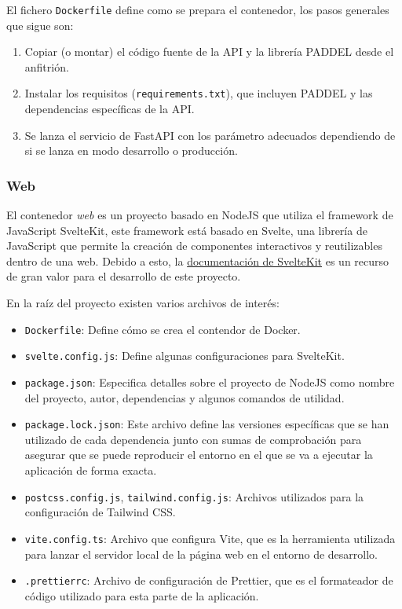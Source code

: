 El fichero \texttt{Dockerfile} define como se prepara el contenedor, los pasos
generales que sigue son:

\begin{enumerate}
    \item Copiar (o montar) el código fuente de la API y la librería PADDEL
          desde el anfitrión.
    \item Instalar los requisitos (\texttt{requirements.txt}), que incluyen
          PADDEL y las dependencias específicas de la API.
    \item Se lanza el servicio de FastAPI con los parámetro adecuados
          dependiendo de si se lanza en modo desarrollo o producción.
\end{enumerate}

\subsubsection{Web}

El contenedor \textit{web} es un proyecto basado en NodeJS que utiliza el
framework de JavaScript SvelteKit, este framework está basado en Svelte, una
librería de JavaScript que permite la creación de componentes interactivos y
reutilizables dentro de una web. Debido a esto, la
\href{https://kit.svelte.dev/docs/introduction}{documentación de SvelteKit} es
un recurso de gran valor para el desarrollo de este proyecto.

En la raíz del proyecto existen varios archivos de interés:

\begin{itemize}
    \item \texttt{Dockerfile}: Define cómo se crea el contendor de Docker.
    \item \texttt{svelte.config.js}: Define algunas configuraciones para
    SvelteKit.
    \item \texttt{package.json}: Especifica detalles sobre el proyecto de NodeJS
          como nombre del proyecto, autor, dependencias y algunos comandos de
          utilidad.
    \item \texttt{package.lock.json}: Este archivo define las versiones
          específicas que se han utilizado de cada dependencia junto con sumas
          de comprobación para asegurar que se puede reproducir el entorno en el
          que se va a ejecutar la aplicación de forma exacta.
    \item \texttt{postcss.config.js}, \texttt{tailwind.config.js}: Archivos
          utilizados para la configuración de Tailwind CSS.
    \item \texttt{vite.config.ts}: Archivo que configura Vite, que es la
    herramienta utilizada para lanzar el servidor local de la página web en el
    entorno de desarrollo.
    \item \texttt{.prettierrc}: Archivo de configuración de Prettier, que es el
    formateador de código utilizado para esta parte de la aplicación.
\end{itemize}

